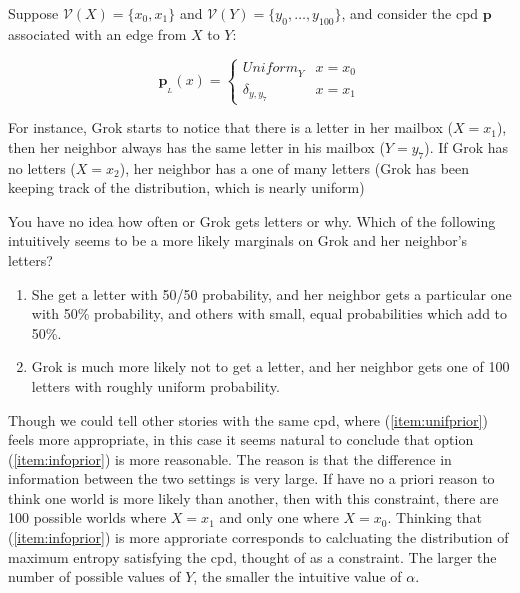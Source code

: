 \documentclass{article}
\theoremstyle{plain}
\theoremstyle{definition}
\theoremstyle{remark}
\newcommand\mat[1]{\mathbf{#1}}
\newcommand{\bp}[1][L]{\mat{p}_{\!_{#1}\!}}
\newcommand{\V}{\mathcal V}
\numberwithin{equation}{section}
\begin{document}
{	\begin{example}\label{ex:alpha-motivation}
		Suppose $\V(X) = \{x_0, x_1\}$ and $\V(Y) = \{y_0,
                \ldots, y_{100}\}$, and consider the cpd $\mat p$
                associated with an edge from $X$ to $Y$: 
		
		\begin{equation}
			\bp(x) = \begin{cases}
				\mathit{Uniform}_Y & x = x_0 \\
				\delta_{y, y_7} & x = x_1
			\end{cases}
		\end{equation}

		For instance, Grok starts to notice that there is a letter in her mailbox ($X = x_1$), then her neighbor always has the same letter in his mailbox ($Y = y_7$). If Grok has no letters ($X = x_2$), her neighbor has a one of many letters (Grok has been keeping track of the distribution, which is nearly uniform)
		
		You have no idea how often or Grok gets letters or why. Which of the following intuitively seems to be a more likely marginals on Grok and her neighbor's letters?
		
		\begin{enumerate}
			\item She get a letter with 50/50 probability, and her neighbor gets a particular one with 50\% probability, and others with small, equal probabilities which add to 50\%. \label{item:unifprior}
			\item Grok is much more likely not to get a letter, and her neighbor gets one of 100 letters with roughly uniform probability. \label{item:infoprior}
		\end{enumerate}
		 	
				
		Though we could tell other stories with the same cpd,
                where (\ref{item:unifprior}) feels more appropriate,
                in this case it seems natural to conclude that option
                (\ref{item:infoprior}) is more reasonable. The reason
                is that the difference in information between the two
                settings is very large. If have no a priori reason to
                think one world is more likely than another, then with
                this constraint, there are 100 possible worlds where
                 $X = x_1$ and only one where $X = x_0$. Thinking that
                (\ref{item:infoprior}) is more approriate corresponds
                to calcluating the distribution of maximum entropy
                satisfying the cpd, thought of as a constraint. The
                larger the number of possible values of $Y$, the
                smaller the intuitive value of $\alpha$. 


\end{example}}
\end{document}
